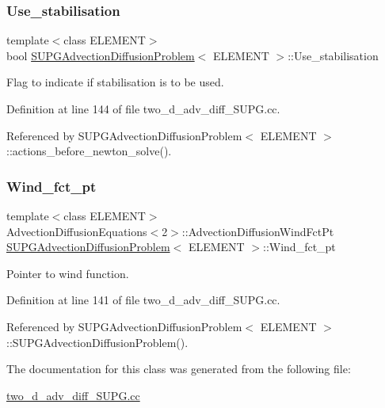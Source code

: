 \subsubsection{\texorpdfstring{Use\+\_\+stabilisation}{Use\_stabilisation}}
{\footnotesize\ttfamily template$<$class E\+L\+E\+M\+E\+NT$>$ \\
bool \hyperlink{classSUPGAdvectionDiffusionProblem}{S\+U\+P\+G\+Advection\+Diffusion\+Problem}$<$ E\+L\+E\+M\+E\+NT $>$\+::Use\+\_\+stabilisation\hspace{0.3cm}{\ttfamily [private]}}



Flag to indicate if stabilisation is to be used. 



Definition at line 144 of file two\+\_\+d\+\_\+adv\+\_\+diff\+\_\+\+S\+U\+P\+G.\+cc.



Referenced by S\+U\+P\+G\+Advection\+Diffusion\+Problem$<$ E\+L\+E\+M\+E\+N\+T $>$\+::actions\+\_\+before\+\_\+newton\+\_\+solve().

\mbox{\label{classSUPGAdvectionDiffusionProblem_a89bc22484946ccf51bb7cf7328bc9df6}} 
\subsubsection{\texorpdfstring{Wind\+\_\+fct\+\_\+pt}{Wind\_fct\_pt}}
{\footnotesize\ttfamily template$<$class E\+L\+E\+M\+E\+NT$>$ \\
Advection\+Diffusion\+Equations$<$2$>$\+::Advection\+Diffusion\+Wind\+Fct\+Pt \hyperlink{classSUPGAdvectionDiffusionProblem}{S\+U\+P\+G\+Advection\+Diffusion\+Problem}$<$ E\+L\+E\+M\+E\+NT $>$\+::Wind\+\_\+fct\+\_\+pt\hspace{0.3cm}{\ttfamily [private]}}



Pointer to wind function. 



Definition at line 141 of file two\+\_\+d\+\_\+adv\+\_\+diff\+\_\+\+S\+U\+P\+G.\+cc.



Referenced by S\+U\+P\+G\+Advection\+Diffusion\+Problem$<$ E\+L\+E\+M\+E\+N\+T $>$\+::\+S\+U\+P\+G\+Advection\+Diffusion\+Problem().



The documentation for this class was generated from the following file\+:\begin{DoxyCompactItemize}
\item 
\hyperlink{two__d__adv__diff__SUPG_8cc}{two\+\_\+d\+\_\+adv\+\_\+diff\+\_\+\+S\+U\+P\+G.\+cc}\end{DoxyCompactItemize}
